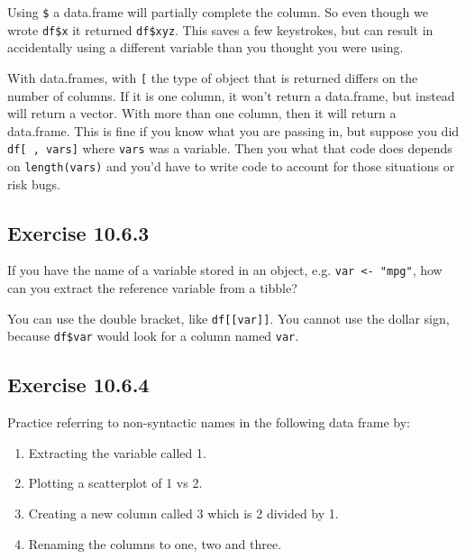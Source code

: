 \documentclass[]{book}
\providecommand{\tightlist}{%
  \setlength{\itemsep}{0pt}\setlength{\parskip}{0pt}}
\theoremstyle{plain}
\theoremstyle{remark}
\theoremstyle{definition}
\theoremstyle{definition}
\theoremstyle{definition}
\theoremstyle{remark}
\begin{document}
Using \texttt{\$} a data.frame will partially complete the column. So
even though we wrote \texttt{df\$x} it returned \texttt{df\$xyz}. This
saves a few keystrokes, but can result in accidentally using a different
variable than you thought you were using.

With data.frames, with \texttt{{[}} the type of object that is returned
differs on the number of columns. If it is one column, it won't return a
data.frame, but instead will return a vector. With more than one column,
then it will return a data.frame. This is fine if you know what you are
passing in, but suppose you did \texttt{df{[}\ ,\ vars{]}} where
\texttt{vars} was a variable. Then you what that code does depends on
\texttt{length(vars)} and you'd have to write code to account for those
situations or risk bugs.

\hypertarget{exercise-10.6.3}{%
\subsection*{\texorpdfstring{Exercise
{10.6.3}}{Exercise 10.6.3}}\label{exercise-10.6.3}}

If you have the name of a variable stored in an object, e.g.
\texttt{var\ \textless{}-\ "mpg"}, how can you extract the reference
variable from a tibble?

You can use the double bracket, like \texttt{df{[}{[}var{]}{]}}. You
cannot use the dollar sign, because \texttt{df\$var} would look for a
column named \texttt{var}.

\hypertarget{exercise-10.6.4}{%
\subsection*{\texorpdfstring{Exercise
{10.6.4}}{Exercise 10.6.4}}\label{exercise-10.6.4}}

Practice referring to non-syntactic names in the following data frame
by:

\begin{enumerate}
\def\labelenumi{\arabic{enumi}.}
\tightlist
\item
  Extracting the variable called 1.
\item
  Plotting a scatterplot of 1 vs 2.
\item
  Creating a new column called 3 which is 2 divided by 1.
\item
  Renaming the columns to one, two and three.
\end{enumerate}
\end{document}
